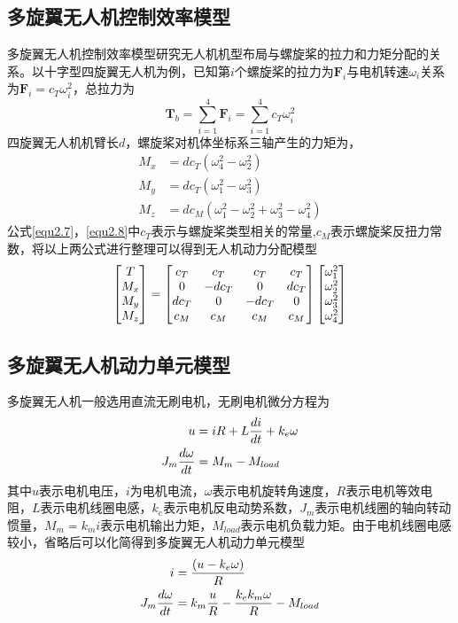 \subsection{多旋翼无人机控制效率模型}
多旋翼无人机控制效率模型研究无人机机型布局与螺旋桨的拉力和力矩分配的关系。以十字型四旋翼无人机为例，已知第$i$个螺旋桨的拉力为$\boldsymbol{F}_i$与电机转速$\omega_i$关系为$\boldsymbol{F}_i = c_T \omega_i^2$，总拉力为
\begin{equation}
\label{equ2.7}
\boldsymbol{T}_b = \sum\limits_{i=1}^4 \boldsymbol{F}_i =  \sum\limits_{i=1}^4 c_T \omega_i^2
\end{equation}
四旋翼无人机机臂长$d$，螺旋桨对机体坐标系三轴产生的力矩为，
\begin{equation}
\label{equ2.8}
\begin{aligned}
M_x &= d c_T \left( \omega_4^2 - \omega_2^2\right)
\\
M_y &= d c_T \left( \omega_1^2 - \omega_3^2\right)
\\
M_z &= d c_M \left( \omega_1^2 - \omega_2^2 + \omega_3^2 - \omega_4^2\right)
\end{aligned}
\end{equation}
公式\eqref{equ2.7}，\eqref{equ2.8}中$c_T $表示与螺旋桨类型相关的常量,$c_M$表示螺旋桨反扭力常数，将以上两公式进行整理可以得到无人机动力分配模型
\begin{equation}
\label{equ2.9}
\begin{bmatrix}
T \cr M_x \cr M_y \cr M_z \cr 
\end{bmatrix}
=
\begin{bmatrix}
c_T & c_T & c_T & c_T  \cr
0 & -d c_T & 0 & d c_T \cr
d c_T & 0 & -d c_T & 0 \cr
c_M & c_M & c_M & c_M  \cr
\end{bmatrix}
\begin{bmatrix}
\omega_1^2 \cr \omega_2^2 \cr \omega_3^2 \cr \omega_4^2 \cr
\end{bmatrix}
\end{equation}


\subsection{多旋翼无人机动力单元模型}
多旋翼无人机一般选用直流无刷电机，无刷电机微分方程为
\begin{equation}
\label{equ2.10}
\begin{aligned}
u &= iR + L {di \over dt} + k_e \omega
\\
J_m {d\omega \over dt} &= M_m - M_{load}
\end{aligned}
\end{equation}
其中$u$表示电机电压，$i$为电机电流，$\omega$表示电机旋转角速度，$R$表示电机等效电阻，$L$表示电机线圈电感，$k_e$表示电机反电动势系数，$J_m$表示电机线圈的轴向转动惯量，$M_m=k_m i$表示电机输出力矩，$M_{load}$表示电机负载力矩。由于电机线圈电感较小，省略后可以化简得到多旋翼无人机动力单元模型
\begin{equation}
\label{equ2.11}
\begin{aligned}
i &= {(u-k_e \omega) \over R }
\\
J_m {d \omega \over dt} &= k_m{u \over R } - {k_e k_m \omega \over R} - M_{load}
\end{aligned}
\end{equation}

